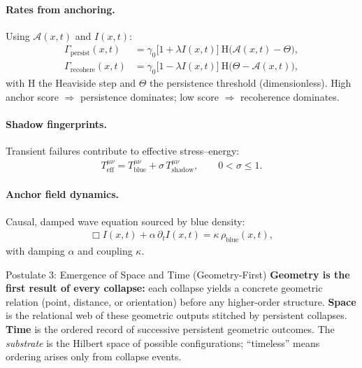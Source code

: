 \documentclass[11pt]{article}
\newcommand{\Hev}{\mathrm{H}} %
\newcommand{\Boxe}{\Box} %
\newcommand{\Acal}{\mathcal{A}}
\begin{document}
\paragraph{Rates from anchoring.}
Using $\Acal(x,t)$ and $I(x,t)$:
\begin{align}
\Gamma_{\mathrm{persist}}(x,t)&=\gamma_0\big[1+\lambda I(x,t)\big]\ \Hev\big(\Acal(x,t)-\Theta\big),\label{eq:GammaPersist}\\
\Gamma_{\mathrm{recohere}}(x,t)&=\gamma_0\big[1-\lambda I(x,t)\big]\ \Hev\big(\Theta-\Acal(x,t)\big),\label{eq:GammaRecoh}
\end{align}
with $\Hev$ the Heaviside step and $\Theta$ the persistence threshold (dimensionless). High anchor score $\Rightarrow$ persistence dominates; low score $\Rightarrow$ recoherence dominates.

\paragraph{Shadow fingerprints.}
Transient failures contribute to effective stress--energy:
\begin{align}
T^{\mu\nu}_{\mathrm{eff}}=T^{\mu\nu}_{\mathrm{blue}}+\sigma\,T^{\mu\nu}_{\mathrm{shadow}},\qquad 0<\sigma\le 1.\label{eq:Teff}
\end{align}

\paragraph{Anchor field dynamics.}
Causal, damped wave equation sourced by blue density:
\begin{align}
\Boxe I(x,t)+\alpha\,\partial_t I(x,t)=\kappa\,\rho_{\mathrm{blue}}(x,t),\label{eq:AnchorPDE}
\end{align}
with damping $\alpha$ and coupling $\kappa$.

\vspace{1em}
\vspace{1em}

\begin{postulate}{Postulate 3: Emergence of Space and Time (Geometry-First)}
\textbf{Geometry is the first result of every collapse:} each collapse yields a concrete geometric relation (point, distance, or orientation) before any higher-order structure. \textbf{Space} is the relational web of these geometric outputs stitched by persistent collapses. \textbf{Time} is the ordered record of successive persistent geometric outcomes. The \emph{substrate} is the Hilbert space of possible configurations; ``timeless'' means ordering arises only from collapse events.
\end{postulate}
\end{document}
